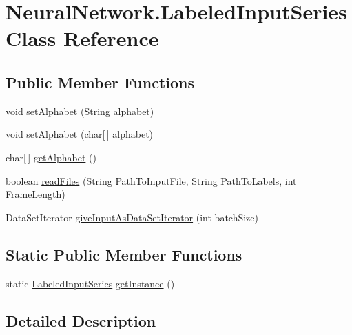 \hypertarget{class_neural_network_1_1_labeled_input_series}{\section{Neural\-Network.\-Labeled\-Input\-Series Class Reference}
\label{class_neural_network_1_1_labeled_input_series}
}
\subsection*{Public Member Functions}
\begin{DoxyCompactItemize}
\item 
void \hyperlink{class_neural_network_1_1_labeled_input_series_acfa2f62f401fc35e0e68def77f1eb8c3}{set\-Alphabet} (String alphabet)
\item 
void \hyperlink{class_neural_network_1_1_labeled_input_series_a4bcb87e2d1987026794bbb0cc815a746}{set\-Alphabet} (char\mbox{[}$\,$\mbox{]} alphabet)
\item 
char\mbox{[}$\,$\mbox{]} \hyperlink{class_neural_network_1_1_labeled_input_series_a73f92e2bf99d4ae9c7c5411fb9a68502}{get\-Alphabet} ()
\item 
boolean \hyperlink{class_neural_network_1_1_labeled_input_series_a652c8a3f24b3a5df6f44ff27f2c15118}{read\-Files} (String Path\-To\-Input\-File, String Path\-To\-Labels, int Frame\-Length)
\item 
Data\-Set\-Iterator \hyperlink{class_neural_network_1_1_labeled_input_series_a13938702aff3425e171505b42b802cad}{give\-Input\-As\-Data\-Set\-Iterator} (int batch\-Size)
\end{DoxyCompactItemize}
\subsection*{Static Public Member Functions}
\begin{DoxyCompactItemize}
\item 
static \hyperlink{class_neural_network_1_1_labeled_input_series}{Labeled\-Input\-Series} \hyperlink{class_neural_network_1_1_labeled_input_series_a10c978482422d530a020f914bf08584a}{get\-Instance} ()
\end{DoxyCompactItemize}


\subsection{Detailed Description}


